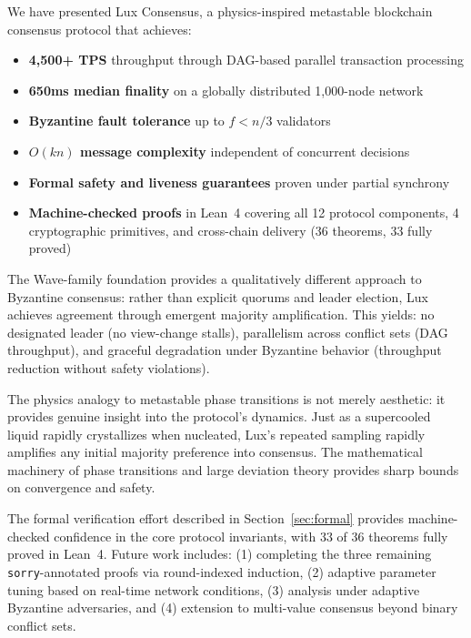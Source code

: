 \documentclass[11pt,a4paper]{article}
\begin{document}
We have presented Lux Consensus, a physics-inspired metastable blockchain consensus
protocol that achieves:

\begin{itemize}[nosep]
\item \textbf{4,500+ TPS} throughput through DAG-based parallel transaction processing
\item \textbf{650ms median finality} on a globally distributed 1,000-node network
\item \textbf{Byzantine fault tolerance} up to $f < n/3$ validators
\item \textbf{$O(kn)$ message complexity} independent of concurrent decisions
\item \textbf{Formal safety and liveness guarantees} proven under partial synchrony
\item \textbf{Machine-checked proofs} in Lean~4 covering all 12 protocol components,
4 cryptographic primitives, and cross-chain delivery (36 theorems, 33 fully proved)
\end{itemize}

The Wave-family foundation provides a qualitatively different approach to Byzantine
consensus: rather than explicit quorums and leader election, Lux achieves agreement through
emergent majority amplification. This yields: no designated leader (no view-change stalls),
parallelism across conflict sets (DAG throughput), and graceful degradation under Byzantine
behavior (throughput reduction without safety violations).

The physics analogy to metastable phase transitions is not merely aesthetic: it provides
genuine insight into the protocol's dynamics. Just as a supercooled liquid rapidly
crystallizes when nucleated, Lux's repeated sampling rapidly amplifies any initial
majority preference into consensus. The mathematical machinery of phase transitions and
large deviation theory provides sharp bounds on convergence and safety.

The formal verification effort described in Section~\ref{sec:formal} provides
machine-checked confidence in the core protocol invariants, with 33 of 36 theorems
fully proved in Lean~4. Future work includes: (1) completing the three remaining
\texttt{sorry}-annotated proofs via round-indexed induction,
(2) adaptive parameter tuning based on real-time network conditions,
(3) analysis under adaptive Byzantine adversaries, and
(4) extension to multi-value consensus beyond binary conflict sets.


\end{document}
